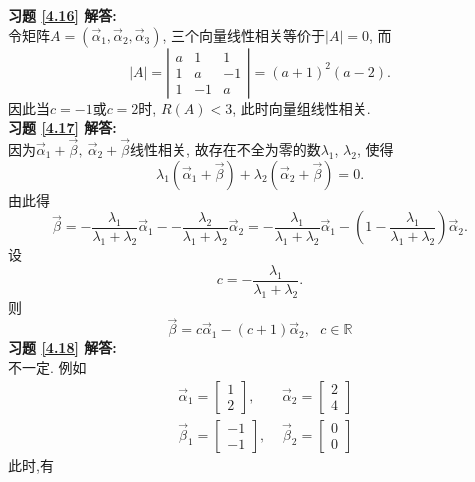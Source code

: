 \textbf{习题 \ref{4.16} 解答:}\\
令矩阵$A=(\vec{\alpha}_1,\vec{\alpha}_2,\vec{\alpha}_3)$, 三个向量线性相关等价于$|A|=0$, 而
$$|A|=\left|\begin{array}{ccc}a&1&1\\1&a&-1\\1&-1&a\end{array}\right|=(a+1)^2(a-2).$$
因此当$c=-1$或$c=2$时, $R(A)<3$, 此时向量组线性相关.\\
\textbf{习题 \ref{4.17} 解答:}\\
因为$\vec{\alpha}_1+\vec{\beta}, \ \vec{\alpha}_2+\vec{\beta}$线性相关, 故存在不全为零的数$\lambda_1$, $\lambda_2$, 使得
$$\lambda_1(\vec{\alpha}_1+\vec{\beta})+\lambda_2(\vec{\alpha}_2+\vec{\beta})=0.$$
由此得
$$\vec{\beta}=-\frac{\lambda_1}{\lambda_1+\lambda_2}\vec{\alpha}_1--\frac{\lambda_2}{\lambda_1+\lambda_2}\vec{\alpha}_2
=-\frac{\lambda_1}{\lambda_1+\lambda_2}\vec{\alpha}_1
-(1-\frac{\lambda_1}{\lambda_1+\lambda_2})\vec{\alpha}_2.$$
设$$c=-\frac{\lambda_1}{\lambda_1+\lambda_2}.$$
则$$\vec{\beta}=c\vec{\alpha}_1-(c+1)\vec{\alpha}_2,\ \ \ c\in\mathbb{R}$$
\textbf{习题 \ref{4.18} 解答:}\\
不一定. 例如
\begin{displaymath}\begin{aligned} &\vec{\alpha}_1=\begin{bmatrix}1\\2\end{bmatrix},\ \ \ \ \ &\vec{\alpha}_2=\begin{bmatrix}2\\4\end{bmatrix}\\&\vec{\beta}_1=\begin{bmatrix}-1\\-1\end{bmatrix}
, &\vec{\beta}_2=\begin{bmatrix}0\\0\end{bmatrix}\end{aligned}\end{displaymath}
此时,有
